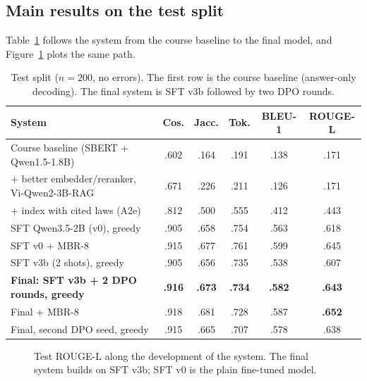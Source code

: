 \documentclass[11pt,a4paper]{article}
\newcommand{\rl}{ROUGE-L}
\newcommand{\best}[1]{\textbf{#1}}
\begin{document}
\subsection{Main results on the test split}
Table~\ref{tab:main} follows the system from the course baseline to the final model, and Figure~\ref{fig:ladder} plots the same path.
\begin{table}[H]
\centering
\caption{Test split ($n{=}200$, no errors). The first row is the course baseline (answer-only decoding). The final system is SFT v3b followed by two DPO rounds.}\label{tab:main}
\begin{tabular}{@{}lccccc@{}}
\toprule
System & Cos. & Jacc. & Tok. & BLEU-1 & \rl{}\\
\midrule
Course baseline (SBERT + Qwen1.5-1.8B) & .602 & .164 & .191 & .138 & .171\\
+ better embedder/reranker, Vi-Qwen2-3B-RAG & .671 & .226 & .211 & .126 & .171\\
+ index with cited laws (A2e) & .812 & .500 & .555 & .412 & .443\\
SFT Qwen3.5-2B (v0), greedy & .905 & .658 & .754 & .563 & .618\\
SFT v0 + MBR-8 & .915 & .677 & .761 & .599 & .645\\
SFT v3b (2 shots), greedy & .905 & .656 & .735 & .538 & .607\\
\midrule
\best{Final: SFT v3b + 2 DPO rounds, greedy} & \best{.916} & \best{.673} & \best{.734} & \best{.582} & \best{.643}\\
Final + MBR-8 & .918 & .681 & .728 & .587 & \best{.652}\\
Final, second DPO seed, greedy & .915 & .665 & .707 & .578 & .638\\
\bottomrule
\end{tabular}
\end{table}

\begin{figure}[H]
\centering
{}
\caption{Test \rl{} along the development of the system. The final system builds on SFT v3b; SFT v0 is the plain fine-tuned model.}\label{fig:ladder}
\end{figure}
\end{document}
